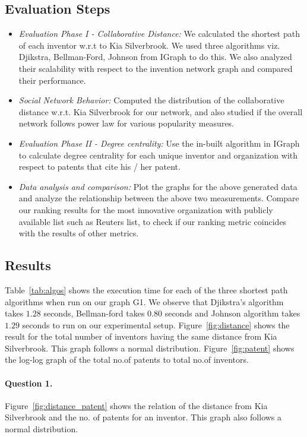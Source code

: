 \subsection{Evaluation Steps}
	\begin{itemize}
		\squish
		\item {\em Evaluation Phase I - Collaborative Distance:} We calculated the 
		shortest path of each inventor w.r.t to Kia Silverbrook. We used three
		algorithms viz. Djikstra, Bellman-Ford, Johnson from IGraph to do this. We
		also analyzed their scalability with respect to the invention network graph
		and compared their performance.
		\item {\em Social Network Behavior:} Computed the distribution of the 
		collaborative distance w.r.t. Kia Silverbrook for our network, and also studied
		if the overall network follows power law for various popularity measures.
		\item {\em Evaluation Phase II - Degree centrality:} Use the in-built
		algorithm in IGraph to calculate degree centrality
		for each unique inventor and organization with respect to patents that cite his / her patent.
		\item {\em Data analysis and comparison:} Plot the graphs for the above
		generated data and analyze the relationship between the above two
		measurements. Compare our ranking results for the most innovative organization
		with publicly available list such as Reuters list, to check if our ranking
		metric coincides with the results of other metrics.
	\end{itemize}



\subsection{Results}
Table~\ref{tab:algos} shows the execution time for each of the three shortest
path algorithms  when run on our graph G1. We observe that Djikstra's
algorithm takes $1.28$ seconds, Bellman-ford takes $0.80$ seconds and Johnson
algorithm takes $1.29$ seconds to run on our experimental setup.
Figure~\ref{fig:distance} shows the result for the total number of inventors
having the same distance from Kia Silverbrook. This graph follows a normal
distribution. Figure~\ref{fig:patent} shows the log-log graph of the total
no.of patents to total no.of inventors. 


\paragraph{Question 1.}
Figure~\ref{fig:distance_patent} shows the relation of the distance from
Kia Silverbrook and the no. of patents for an inventor. This graph also follows a
normal distribution.

